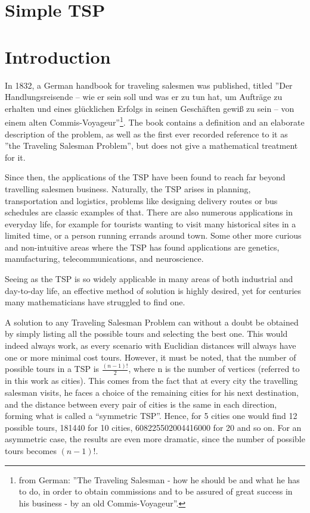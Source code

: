 \section{Simple TSP}

\section{Introduction}

\par
In 1832, a German handbook for traveling salesmen was published, titled ''Der Handlungsreisende – wie er sein soll und was er zu tun hat, um Aufträge zu erhalten und eines glücklichen Erfolgs in seinen Geschäften gewiß zu sein – von einem alten Commis-Voyageur''\footnote{%
	from German: ''The Traveling Salesman - how he should be and what he has to do, in order to obtain commissions and to be assured of great success in his business - by an old Commis-Voyageur''.}. 
 The book contains a definition and an elaborate description of the problem, as well as the first ever recorded reference to it as ''the Traveling Salesman Problem'', but does not give a mathematical treatment for it. 
 
\vspace{5mm}
Since then, the applications of the TSP have been found to reach far beyond travelling salesmen business. Naturally, the TSP arises in planning, transportation and logistics, problems like designing delivery routes or bus schedules are classic examples of that. There are also numerous applications in everyday life, for example for tourists wanting to visit many historical sites in a limited time, or a person running errands around town. Some other more curious and non-intuitive areas where the TSP has found applications are genetics, manufacturing, telecommunications, and neuroscience.

\vspace{5mm}
Seeing as the TSP is so widely applicable in many areas of both industrial and day-to-day life, an effective method of solution is highly desired, yet for centuries many mathematicians have struggled to find one.

\vspace{5mm}
A solution to any Traveling Salesman Problem can without a doubt be obtained by simply listing all the possible tours and selecting the best one. This would indeed always work, as every scenario with Euclidian distances will always have one or more minimal cost tours. However, it must be noted, that the number of possible tours in a TSP is $\frac{(n-1)!}{2}$, where n is the number of vertices (referred to in this work as cities). This comes from the fact that at every city the travelling salesman visits, he faces a choice of the remaining cities for his next destination, and the distance between every pair of cities is the same in each direction, forming what is called a “symmetric TSP”. Hence, for 5 cities one would find 12 possible tours, 181440 for 10 cities, 608225502004416000 for 20 and so on. For an asymmetric case, the results are even more dramatic, since the number of possible tours becomes $(n-1)!$.

